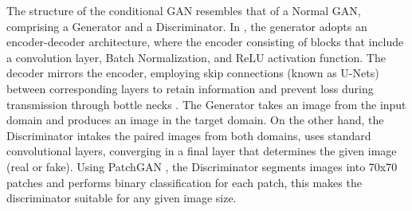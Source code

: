 \documentclass[12pt,twoside,a4paper,parskip]{scrbook} %
\begin{document}
The structure of the conditional GAN resembles that of a Normal GAN, comprising a Generator and a Discriminator. In \cite{12_pix2pix}, the generator adopts an encoder-decoder architecture, where the encoder consisting of blocks that include a convolution layer, Batch Normalization, and ReLU activation function. The decoder mirrors the encoder, employing skip connections (known as U-Nets) between corresponding layers to retain information and prevent loss during transmission through bottle necks \cite{11_image2_image}. The Generator takes an image from the input domain and produces an image in the target domain. On the other hand, the Discriminator intakes the paired images from both domains, uses standard convolutional layers, converging in a final layer that determines the given image (real or fake). Using PatchGAN \cite{patchgan}, the Discriminator segments images into 70x70 patches and performs binary classification for each patch, this makes the discriminator suitable for any given image size.
\end{document}

